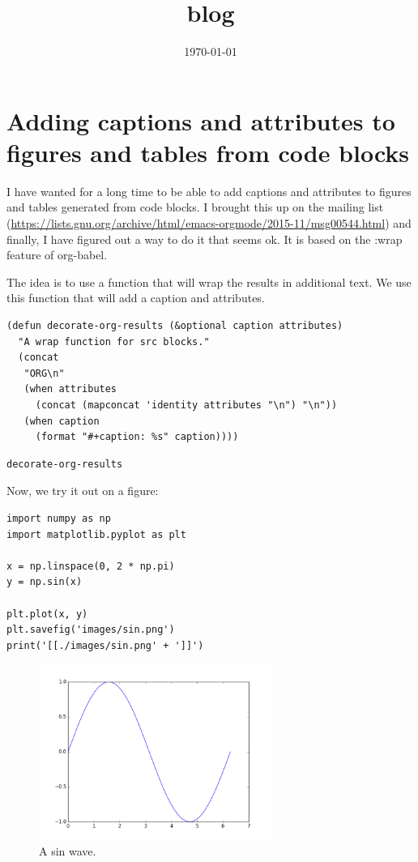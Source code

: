 \documentclass[11pt]{article}
\date{\today}
\title{blog}
\begin{document}
\section{Adding captions and attributes to figures and tables from code blocks}
\label{sec-1}

I have wanted for a long time to be able to add captions and attributes to figures and tables generated from code blocks. I brought this up on the mailing list (\url{https://lists.gnu.org/archive/html/emacs-orgmode/2015-11/msg00544.html}) and finally, I have figured out a way to do it that seems ok. It is based on the :wrap feature of org-babel.

The idea is to use a function that will wrap the results in additional text. We use this function that will add a caption and attributes.

\begin{verbatim}
(defun decorate-org-results (&optional caption attributes)
  "A wrap function for src blocks."
  (concat
   "ORG\n"
   (when attributes
     (concat (mapconcat 'identity attributes "\n") "\n"))
   (when caption
     (format "#+caption: %s" caption))))
\end{verbatim}

\begin{verbatim}
decorate-org-results
\end{verbatim}

Now, we try it out on a figure:

\begin{verbatim}
import numpy as np
import matplotlib.pyplot as plt

x = np.linspace(0, 2 * np.pi)
y = np.sin(x)

plt.plot(x, y)
plt.savefig('images/sin.png')
print('[[./images/sin.png' + ']]')
\end{verbatim}

\begin{org}
\begin{figure}[htb]
\centering
\includegraphics[width=3in]{./images/sin.png}
\caption{A sin wave. \label{fig-sin}}
\end{figure}
\end{org}
\end{document}
